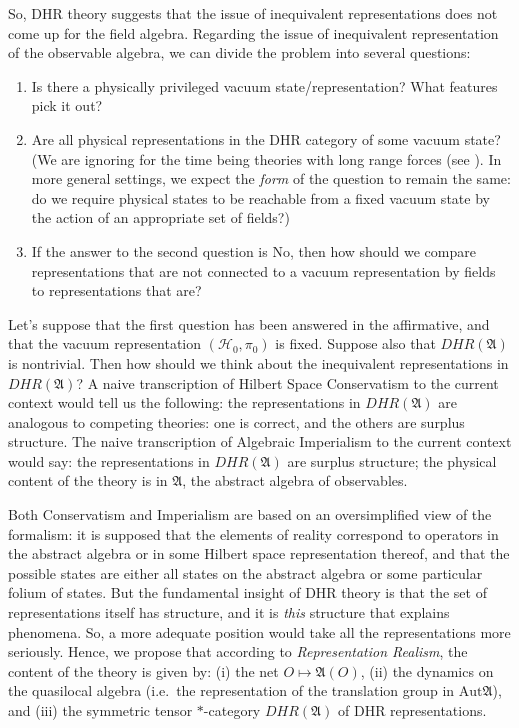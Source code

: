 \documentclass[11pt]{article}
\theoremstyle{definition}
\theoremstyle{definition}
\theoremstyle{remark}
\def\2#1{{\mathcal #1}}
\def\al#1{{\mathfrak #1}}
\newcommand{\Aut}{\mathrm{Aut}}
\begin{document}
So, DHR theory suggests that the issue of inequivalent representations
does not come up for the field algebra.  Regarding the issue of
inequivalent representation of the observable algebra, we can divide
the problem into several questions: 

\begin{enumerate}
\item Is there a physically privileged vacuum state/representation?
  What features pick it out?
\item Are all physical representations in the DHR category of some
  vacuum state?  (We are ignoring for the time being theories with
  long range forces (see \cite{buch-fred}).  In more general settings,
  we expect the \emph{form} of the question to remain the same: do we
  require physical states to be reachable from a fixed vacuum state by
  the action of an appropriate set of fields?)
\item If the answer to the second question is No, then how should we
  compare representations that are not connected to a vacuum
  representation by fields to representations that are?
\end{enumerate}

Let's suppose that the first question has been answered in the
affirmative, and that the vacuum representation $(\2H _0,\pi _0 )$ is
fixed.  Suppose also that $DHR(\al A)$ is nontrivial.  Then how should
we think about the inequivalent representations in $DHR(\al A)$?  A
naive transcription of Hilbert Space Conservatism to the current
context would tell us the following: the representations in $DHR(\al
A)$ are analogous to competing theories: one is correct, and the
others are surplus structure.  The naive transcription of Algebraic
Imperialism to the current context would say: the representations in
$DHR(\al A)$ are surplus structure; the physical content of the theory
is in $\al A$, the abstract algebra of observables.

Both Conservatism and Imperialism are based on an
oversimplified view of the formalism: it is supposed
that the elements of reality correspond to operators in
the abstract algebra or in some Hilbert space
representation thereof, and that the possible states
are either all states on the abstract algebra or some
particular folium of states.  But the fundamental
insight of DHR theory is that the set of
representations itself has structure, and it is
\emph{this} structure that explains phenomena.  So, a
more adequate position would take all the
representations more seriously.  Hence, we propose that
according to \emph{Representation Realism}, the content
of the theory is given by: (i) the net $O\mapsto \al
A(O)$, (ii) the dynamics on the quasilocal algebra
(i.e.\ the representation of the translation group in
$\Aut \al A$), and (iii) the symmetric tensor
$*$-category $DHR(\al A)$ of DHR representations.
\end{document}
